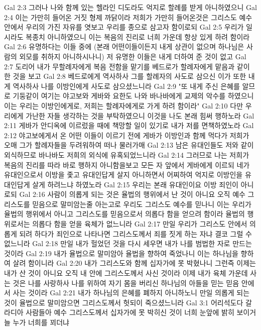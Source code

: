 Gal 2:3  그러나 나와 함께 있는 헬라인 디도라도 억지로 할례를 받게 아니하였으니
Gal 2:4  이는 가만히 들어온 거짓 형제 까닭이라 저희가 가만히 들어온것은 그리스도 예수 안에서 우리의 가진 자유를 엿보고 우리를 종으로 삼고자 함이로되
Gal 2:5  우리가 일시라도 복종치 아니하였으니 이는 복음의 진리로 너희 가운데 항상 있게 하려 함이라
Gal 2:6  유명하다는 이들 중에 (본래 어떤이들이든지 내게 상관이 없으며 하나님은 사람의 외모를 취하지 아니하시나니) 저 유명한 이들은 내게 더하여 준 것이 없고
Gal 2:7  도리어 내가 무할례자에게 복음 전함을 맡기를 베드로가 할례자에게 맡음과 같이 한 것을 보고
Gal 2:8  베드로에게 역사하사 그를 할례자의 사도로 삼으신 이가 또한 내게 역사하사 나를 이방인에게 사도로 삼으셨느니라
Gal 2:9  "또 내게 주신 은혜를 알므로 기둥같이 여기는 야고보와 게바와 요한도 나와 바나바에게 교제의 악수를 하였으니 이는 우리는 이방인에게로, 저희는 할례자에게로 가게 하려 함이라"
Gal 2:10  다만 우리에게 가난한 자들 생각하는 것을 부탁하였으니 이것을 나도 본래 힘써 행하노라
Gal 2:11  게바가 안디옥에 이르렀을 때에 책망할 일이 있기로 내가 저를 면책하였노라
Gal 2:12  야고보에게서 온 어떤 이들이 이르기 전에 게바가 이방인과 함께 먹다가 저희가 오매 그가 할례자들을 두려워하여 떠나 물러가매
Gal 2:13  남은 유대인들도 저와 같이 외식하므로 바나바도 저희의 외식에 유혹되었느니라
Gal 2:14  그러므로 나는 저희가 복음의 진리를 따라 바로 행하지 아니함을보고 모든 자 앞에서 게바에게 이르되 네가 유대인으로서 이방을 좇고 유대인답게 살지 아니하면서 어찌하여 억지로 이방인을 유대인답게 살게 하려느냐 하였노라
Gal 2:15  우리는 본래 유대인이요 이방 죄인이 아니로되
Gal 2:16  사람이 의롭게 되는 것은 율법의 행위에서 난 것이 아니요 오직 예수 그리스도를 믿음으로 말미암는줄 아는고로 우리도 그리스도 예수를 믿나니 이는 우리가 율법의 행위에서 아니고 그리스도를 믿음으로서 의롭다 함을 얻으려 함이라 율법의 행위로서는 의롭다 함을 얻을 육체가 없느니라
Gal 2:17  만일 우리가 그리스도 안에서 의롭게 되려 하다가 죄인으로 나타나면 그리스도께서 죄를 짓게 하는 자냐 결코 그럴 수 없느니라
Gal 2:18  만일 내가 헐었던 것을 다시 세우면 내가 나를 범법한 자로 만드는 것이라
Gal 2:19  내가 율법으로 말미암아 율법을 향하여 죽었나니 이는 하나님을 향하여 살려 함이니라
Gal 2:20  내가 그리스도와 함께 십자가에 못 박혔나니 그런즉 이제는 내가 산 것이 아니요 오직 내 안에 그리스도께서 사신 것이라 이제 내가 육체 가운데 사는 것은 나를 사랑하사 나를 위하여 자기 몸을 버리신 하나님의 아들을 믿는 믿음 안에서 사는 것이라
Gal 2:21  내가 하나님의 은혜를 폐하지 아니하노니 만일 의롭게 되는 것이 율법으로 말미암으면 그리스도께서 헛되이 죽으셨느니라
Gal 3:1  어리석도다 갈라디아 사람들아 예수 그리스도께서 십자가에 못 박히신 것이 너희 눈앞에 밝히 보이거늘 누가 너희를 꾀더냐

